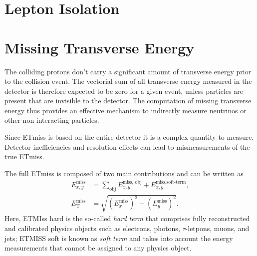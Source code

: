 
\section{Lepton Isolation}



\section{Missing Transverse Energy}
\cite{PERF-2016-07}

The colliding protons don't carry a significant amount of transverse energy prior to the collision event.
The vectorial sum of all transverse energy measured in the detector is therefore expected to be zero for a given event, unless particles are present that are invisible to the detector. The computation of missing transverse energy thus provides an effective mechanism to indirectly measure neutrinos or other non-interacting particles. 

Since ETmiss is based on the entire detector it is a complex quantity to measure. 
Detector inefficiencies and resolution effects can lead to mismeasurements of the true ETmiss.

The full ETmiss is composed of two main contributions and can be written as
\begin{align}
    E_{x,y}^\text{miss} &= \sum_{\text{obj}} E_{x,y}^\text{miss, obj} + E_{x,y}^\text{miss,soft-term}, \\
    E_{\text{T}}^\text{miss} &= \sqrt{ \left( E_x^{\text{miss}} \right)^2 + \left(  E_y^{\text{miss}}\right)^2 }.
    \label{eq:met}
  \end{align}
Here, ETMIss hard is the so-called \emph{hard term} that comprises fully reconstructed and calibrated physics objects such as electrons, photons, $\tau$-letpons, muons, and jets; ETMISS soft is known as \emph{soft term} and takes into account the energy measurements that cannot be assigned to any physics object.

